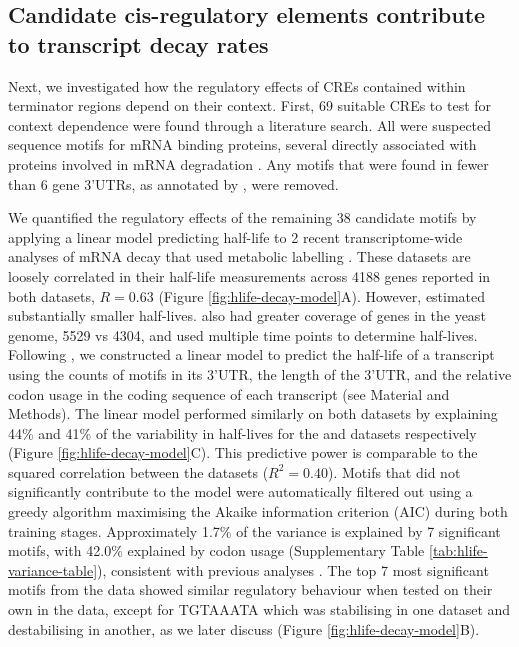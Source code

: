 \documentclass[../main.tex]{subfiles}
\begin{document}
\subsection{Candidate cis-regulatory elements contribute to transcript decay rates}

Next, we investigated how the regulatory effects of CREs contained within terminator regions depend on their context.
First, 69 suitable CREs to test for context dependence were found through a literature search.
All were suspected sequence motifs for mRNA binding proteins, several directly associated with proteins involved in mRNA degradation \parencite{Hogan2008,Shalgi2005,Cheng2017}.
Any motifs that were found in fewer than 6 gene 3'UTRs, as annotated by \parencite{Pelechano2013}, were removed.

We quantified the regulatory effects of the remaining 38 candidate motifs by applying a linear model predicting half-life to 2 recent transcriptome-wide analyses of mRNA decay that used metabolic labelling \parencite{Chan2018,Sun2013}.
These datasets are loosely correlated in their half-life measurements across 4188 genes reported in both datasets, \(R = 0.63\) (Figure \ref{fig:hlife-decay-model}A). However, \parencite{Chan2018} estimated substantially smaller half-lives.
\parencite{Chan2018} also had greater coverage of genes in the yeast genome, 5529 vs 4304, and used multiple time points to determine half-lives.
Following \parencite{Cheng2017}, we constructed a linear model to predict the half-life of a transcript using the counts of motifs in its 3'UTR, the length of the 3'UTR, and the relative codon usage in the coding sequence of each transcript (see Material and Methods).
The linear model performed similarly on both datasets by explaining 44\% and 41\% of the variability in half-lives for the \parencite{Chan2018} and \parencite{Sun2013} datasets respectively (Figure \ref{fig:hlife-decay-model}C).
This predictive power is comparable to the squared correlation between the datasets (\(R^2 = 0.40\)).
Motifs that did not significantly contribute to the model were automatically filtered out using a greedy algorithm maximising the Akaike information criterion (AIC) during both training stages.
Approximately 1.7\% of the variance is explained by 7 significant motifs, with 42.0\% explained by codon usage (Supplementary Table \ref{tab:hlife-variance-table}), consistent with previous analyses \parencite{Cheng2017, Presnyak2015}.
The top 7 most significant motifs from the \parencite{Chan2018} data showed similar regulatory behaviour when tested on their own in the \parencite{Sun2013} data, except for TGTAAATA which was stabilising in one dataset and destabilising in another, as we later discuss (Figure \ref{fig:hlife-decay-model}B).
\end{document}
